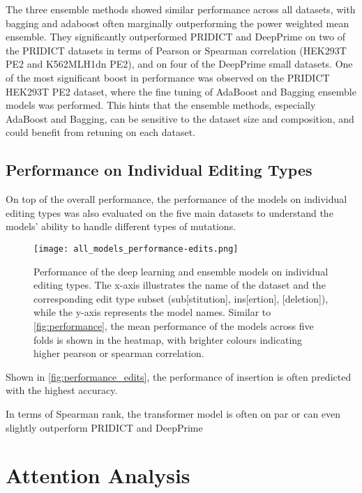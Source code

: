 The three ensemble methods showed similar performance across all datasets, with bagging and adaboost often marginally outperforming the power weighted mean ensemble. They significantly outperformed PRIDICT and DeepPrime on two of the PRIDICT datasets in terms of Pearson or Spearman correlation (HEK293T PE2 and K562MLH1dn PE2), and on four of the DeepPrime small datasets. One of the most significant boost in performance was observed on the PRIDICT HEK293T PE2 dataset, where the fine tuning of AdaBoost and Bagging ensemble models was performed. This hints that the ensemble methods, especially AdaBoost and Bagging, can be sensitive to the dataset size and composition, and could benefit from retuning on each dataset.


\subsection{Performance on Individual Editing Types}

On top of the overall performance, the performance of the models on individual editing types was also evaluated on the five main datasets to understand the models' ability to handle different types of mutations. 

\begin{figure}
    \centering
    \texttt{[image: all\_models\_performance-edits.png]}
    \caption[Performance of the models on individual editing types]{Performance of the deep learning and ensemble models on individual editing types. The x-axis illustrates the name of the dataset and the corresponding edit type subset (sub[stitution], ins[ertion], [deletion]), while the y-axis represents the model names. Similar to \autoref{fig:performance}, the mean performance of the models across five folds is shown in the heatmap, with brighter colours indicating higher pearson or spearman correlation.}
    \label{fig:performance_edits}
\end{figure}

Shown in \autoref{fig:performance_edits}, the performance of insertion is often predicted with the highest accuracy. 

In terms of Spearman rank, the transformer model is often on par or can even slightly outperform PRIDICT and DeepPrime

\section{Attention Analysis}
\label{sec:attention_analysis}

